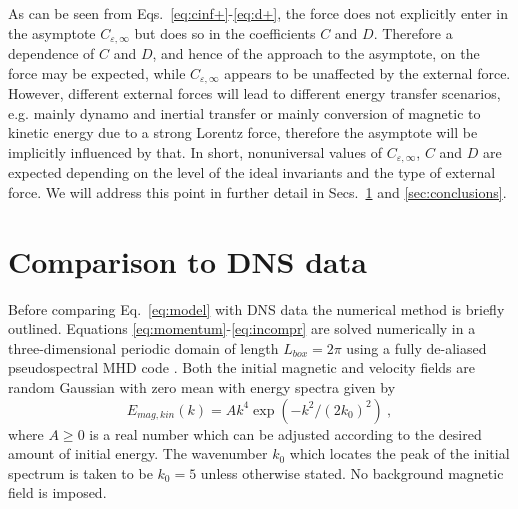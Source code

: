 \documentclass[aps,pre,onecolumn,superscriptaddress,notitlepage]{revtex4-1}
\newcommand{\Cinf}{C_{\varepsilon,\infty}}
\newcommand{\beq}{\begin{equation}}
\newcommand{\eeq}{\end{equation}}
\begin{document}
As can be seen from Eqs.~\eqref{eq:cinf+}-\eqref{eq:d+},  
the force does not explicitly enter in the asymptote $\Cinf$ but
does so in the coefficients $C$ and $D$. 
Therefore a dependence of $C$ and $D$, and hence of the 
approach to the asymptote, on the force may be expected, while $\Cinf$ 
appears to be unaffected by the external force.   
However, different external forces will lead to different
energy transfer scenarios, e.g. mainly dynamo and inertial transfer or mainly 
conversion of magnetic to kinetic energy due to a strong Lorentz force, 
therefore the asymptote will be implicitly influenced by that. 
In short, nonuniversal values of $\Cinf$, $C$ and $D$ are expected depending 
on the level of the ideal invariants and the type of external force.
We will address this point in further detail in Secs.~\ref{sec:numerics} and \ref{sec:conclusions}. 

\section{Comparison to DNS data}
\label{sec:numerics}
Before comparing Eq.~\eqref{eq:model} with DNS data 
the numerical method is briefly outlined.
Equations \eqref{eq:momentum}-\eqref{eq:incompr} are solved numerically
in a three-dimensional periodic domain of length $L_{box}=2 \pi$
using a fully de-aliased pseudospectral MHD code \cite{Berera14a,Linkmann_thesis}.
Both the initial magnetic
and velocity fields are random Gaussian with zero mean with energy spectra 
given by
\beq
E_{mag,kin}(k)=A k^4\exp(-k^2/(2k_0)^2) \ ,
\eeq
where $A \geqslant 0$ is a real number which can be adjusted according to
the desired amount of initial energy. The wavenumber $k_0$ which locates
the peak of the initial spectrum is taken to be $k_0 = 5$ unless otherwise stated. 
No background magnetic field is imposed.
\end{document}
